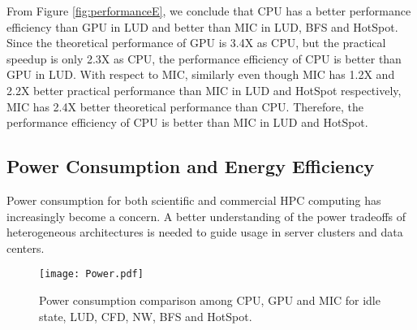 From Figure \ref{fig:performanceE}, we conclude that CPU has a better performance efficiency than GPU in LUD and better than MIC in LUD, BFS and HotSpot. Since the theoretical performance of GPU is 3.4X as CPU, but the practical speedup is only 2.3X as CPU, the performance efficiency of CPU is better than GPU in LUD. With respect to MIC, similarly even though MIC has 1.2X and 2.2X better practical performance than MIC in LUD and HotSpot respectively, MIC has 2.4X better theoretical performance than CPU. Therefore, the performance efficiency of CPU is better than MIC in LUD and HotSpot.



  
\subsection{Power Consumption and Energy Efficiency}

Power consumption for both scientific and commercial HPC computing has increasingly become a concern.
A better understanding of the power tradeoffs of heterogeneous architectures is needed to 
guide usage in server clusters and data centers. 

    \begin{figure}[h!]
  \centering
  \begin{minipage}{0.5\textwidth}
    \centering
   \centering
     \texttt{[image: Power.pdf]}    
\caption{Power consumption comparison among CPU, GPU and MIC for idle state, LUD, CFD, NW, BFS and HotSpot.}
\label{fig:power}
\end{minipage}%
\end{figure}

